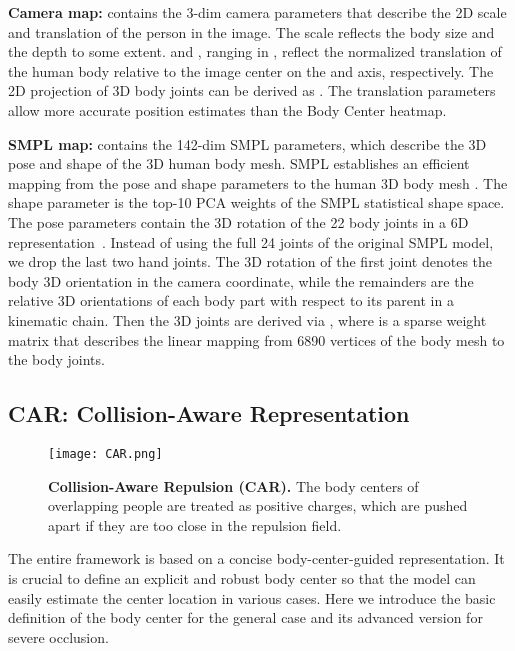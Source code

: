 \documentclass[10pt,twocolumn,letterpaper]{article}
\begin{document}
\textbf{Camera map:}   contains the 3-dim camera parameters  that describe the 2D scale  and translation  of the person in the image. 
The scale  reflects the body size and the depth to some extent.
 and , ranging in , reflect the normalized translation of the human body relative to the image center on the  and  axis, respectively.
The 2D projection  of  3D body joints  can be derived as  .
The translation parameters allow more accurate position estimates than the Body Center heatmap. 

\textbf{SMPL map:}   contains the 142-dim SMPL parameters, which describe the 3D pose and shape of the 3D human body mesh. 
SMPL establishes an efficient mapping from the pose    and shape  parameters to the human 3D body mesh .
The shape parameter  is the top-10 PCA weights of the SMPL statistical shape space. 
The pose parameters  contain the 3D rotation of the 22 body joints in a 6D representation~\cite{Zhou_2019_CVPR}.  Instead of using the full 24 joints of the original SMPL model, we drop the last two hand joints. 
The 3D rotation of the first joint denotes the body 3D orientation in the camera coordinate, while the remainders are the relative 3D orientations of each body part with respect to its parent in a kinematic chain. 
Then the 3D joints  are derived via , where  is a sparse weight matrix that describes the linear mapping from 6890 vertices of the body mesh to the  body joints.

\vspace{-1mm}
\subsection{CAR: Collision-Aware Representation~\label{sec:CAR}}
\vspace{-1mm}

\begin{figure}[t]
	\centering
	\texttt{[image: CAR.png]} \caption{{\bf Collision-Aware Repulsion (CAR).} The body centers of overlapping people are treated as positive charges, which are pushed apart if they are too close in the repulsion field. }\vspace{-4mm}
	\label{fig:CAR}
\end{figure}

The entire framework is based on a concise body-center-guided representation. 
It is crucial to define an explicit and robust body center so that the model can easily estimate the center location in various cases.  Here we introduce the basic definition of the body center for the general case and its advanced version for severe occlusion.
\end{document}
